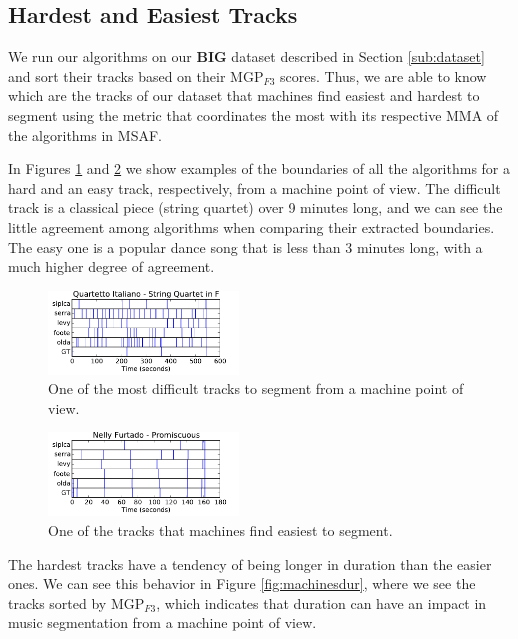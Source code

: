\documentclass{article}
\begin{document}
\subsection{Hardest and Easiest Tracks}\label{sub:hard-easy}

We run our algorithms on our \textbf{BIG} dataset described in Section \ref{sub:dataset} and sort their tracks based on their MGP$_{F3}$ scores.
Thus, we are able to know which are the tracks of our dataset that machines find easiest and hardest to segment using the metric that coordinates the most with its respective MMA of the algorithms in MSAF.

In Figures \ref{fig:quartetto} and \ref{fig:promiscuous} we show examples of the boundaries of all the algorithms for a hard and an easy track, respectively, from a machine point of view.
The difficult track is a classical piece (string quartet) over 9 minutes long, and we can see the little agreement among algorithms when comparing their extracted boundaries.
The easy one is a popular dance song that is less than 3 minutes long, with a much higher degree of agreement.

\begin{figure}
  \centering
  \includegraphics[width=0.45\textwidth, height=0.13\textheight]{plots/Quartetto-machine.pdf}
  \caption{One of the most difficult tracks to segment from a machine point of view.}
  \label{fig:quartetto}
\end{figure}%

\begin{figure}
  \centering
  \includegraphics[width=0.45\textwidth, height=0.13\textheight]{plots/Promiscuous-machine.pdf}
  \caption{One of the tracks that machines find easiest to segment.}
  \label{fig:promiscuous}
\end{figure}%

The hardest tracks have a tendency of being longer in duration than the easier ones.
We can see this behavior in Figure \ref{fig:machinesdur}, where we see the tracks sorted by MGP$_{F3}$, which indicates that duration can have an impact in music segmentation from a machine point of view.
\end{document}
